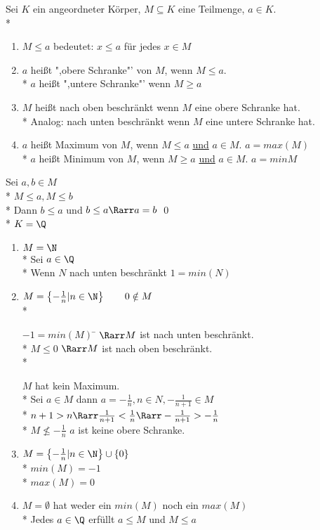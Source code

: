 	Sei $K$ ein angeordneter Körper, $M \subseteq K$ eine Teilmenge, $a \in K$.\\*
	\begin{enumerate}
	\item{$M \leq a$ bedeutet: $x \leq a$ für jedes $x \in M$}
	\item{$a$ heißt ",obere Schranke"' von $M$, wenn $M \leq a$.\\*
		$a$ heißt ",untere Schranke"' wenn $M \geq a$}
	\item{$M$ heißt nach oben beschränkt wenn $M$ eine obere Schranke hat.\\*
	Analog: nach unten beschränkt wenn $M$ eine untere Schranke hat.}
	\item{$a$ heißt Maximum von $M$, wenn $M \leq a$ \ul{und} $a \in M$. $a = max(M)$\\*
		$a$ heißt Minimum von $M$, wenn $M \geq a$ \ul{und} $a \in M$. $a = min{M}$}
	\end{enumerate}
\bew
	Sei $a, b \in M$\\*
	$M \leq a, M \leq b$\\*
	Dann $b \leq a$ und $b \leq a \Rarr a = b$ \qed\\*
\bsp
	$K = \Q$
	\begin{enumerate}
	\item{$M = \N$\\*
	Sei $a \in \Q$\\*
	Wenn $N$ nach unten beschränkt $1 = min(N)$}
	\item{$M = \left\lbrace -\frac{1}{n} | n \in \N \right\rbrace \qquad 0 \notin M$\\*
	\begin{tabbing}
	$-1 = min(M)$ \= $\Rarr M$ ist nach unten beschränkt.\\*
	$M \leq 0$	\> $\Rarr M$ ist nach oben beschränkt.\\*
	\end{tabbing}
	$M$ hat kein Maximum.\\*
	Sei $a \in M$ dann $a = -\frac{1}{n}, n \in N, -\frac{1}{n + 1} \in M$\\*
	$n + 1 > n \Rarr \frac{1}{n + 1} < \frac{1}{n} \Rarr -\frac{1}{n + 1} > -\frac{1}{n}$\\*
	$M \nleq -\frac{1}{n}$ $a$ ist keine obere Schranke.}
	\item{$M = \left\lbrace -\frac{1}{n} | n \in \N\right\rbrace \cup \{ 0 \}$\\*
	$min(M) = -1$\\*
	$max(M) = 0$}
	\item{$M = \emptyset$ hat weder ein $min(M)$ noch ein $max(M)$\\*
	Jedes $a \in \Q$ erfüllt $a \leq M$ und $M \leq a$}
	\end{enumerate}

